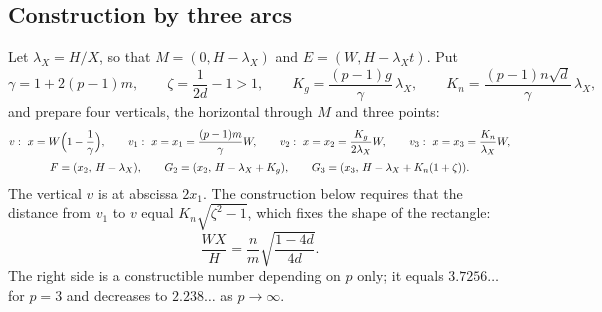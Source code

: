 \subsection{Construction by three arcs}\label{sec:mean-construction}

Let $\lambda_X=H/X$, so that $M=(0,H-\lambda_X)$ and $E=(W,H-\lambda_X t)$. Put
\[ \gamma=1+2(p-1)m,\qquad \zeta=\frac1{2d}-1>1,\qquad K_g=\frac{(p-1)g}{\gamma}\,\lambda_X,\qquad
K_n=\frac{(p-1)n\sqrt d}{\gamma}\,\lambda_X , \]
and prepare four verticals, the horizontal through $M$ and three points:
\[ \begin{gathered}
v:\ x=W\Bigl(1-\frac1\gamma\Bigr),\qquad v_1:\ x=x_1=\frac{(p-1)m}{\gamma}W,\qquad
v_2:\ x=x_2=\frac{K_g}{2\lambda_X}W,\qquad v_3:\ x=x_3=\frac{K_n}{\lambda_X}W,\\[2pt]
F=(x_2,\,H-\lambda_X),\qquad G_2=(x_2,\,H-\lambda_X+K_g),\qquad G_3=(x_3,\,H-\lambda_X+K_n(1+\zeta)).
\end{gathered} \]
The vertical $v$ is at abscissa $2x_1$. The construction below requires that the distance from $v_1$ to
$v$ equal $K_n\sqrt{\zeta^{2}-1}$, which fixes the shape of the rectangle:
\begin{equation}\label{eq:aspect}
\frac{WX}{H}=\frac nm\sqrt{\frac{1-4d}{4d}} .
\end{equation}
The right side is a constructible number depending on $p$ only; it equals $3.7256\ldots$ for $p=3$ and
decreases to $2.238\ldots$ as $p\to\infty$.

